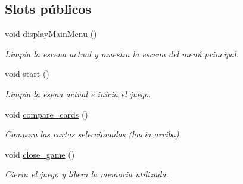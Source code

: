 \subsection*{Slots públicos}
\begin{DoxyCompactItemize}
\item 
\hypertarget{classGame__r_afa9d1405438a52347f726e9aff58c6e8}{void \hyperlink{classGame__r_afa9d1405438a52347f726e9aff58c6e8}{display\-Main\-Menu} ()}\label{classGame__r_afa9d1405438a52347f726e9aff58c6e8}

\begin{DoxyCompactList}\small\item\em Limpia la escena actual y muestra la escena del menú principal. \end{DoxyCompactList}\item 
\hypertarget{classGame__r_a3b39f16df21e7285347a5ce8af4d76e8}{void \hyperlink{classGame__r_a3b39f16df21e7285347a5ce8af4d76e8}{start} ()}\label{classGame__r_a3b39f16df21e7285347a5ce8af4d76e8}

\begin{DoxyCompactList}\small\item\em Limpia la esena actual e inicia el juego. \end{DoxyCompactList}\item 
\hypertarget{classGame__r_afba7fef076f6f41381cc9df2b4837438}{void \hyperlink{classGame__r_afba7fef076f6f41381cc9df2b4837438}{compare\-\_\-cards} ()}\label{classGame__r_afba7fef076f6f41381cc9df2b4837438}

\begin{DoxyCompactList}\small\item\em Compara las cartas seleccionadas (hacia arriba). \end{DoxyCompactList}\item 
\hypertarget{classGame__r_a198360c9ed87d23ffe9ed1ca5c56e946}{void \hyperlink{classGame__r_a198360c9ed87d23ffe9ed1ca5c56e946}{close\-\_\-game} ()}\label{classGame__r_a198360c9ed87d23ffe9ed1ca5c56e946}

\begin{DoxyCompactList}\small\item\em Cierra el juego y libera la memoria utilizada. \end{DoxyCompactList}\end{DoxyCompactItemize}
